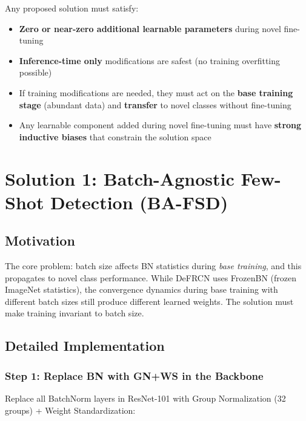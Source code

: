 \documentclass[11pt,a4paper]{article}
\begin{document}
Any proposed solution must satisfy:
\begin{itemize}[nosep]
    \item \textbf{Zero or near-zero additional learnable parameters} during novel fine-tuning
    \item \textbf{Inference-time only} modifications are safest (no training overfitting possible)
    \item If training modifications are needed, they must act on the \textbf{base training stage} (abundant data) and \textbf{transfer} to novel classes without fine-tuning
    \item Any learnable component added during novel fine-tuning must have \textbf{strong inductive biases} that constrain the solution space
\end{itemize}


\section{Solution 1: Batch-Agnostic Few-Shot Detection (BA-FSD)}
\label{sec:bafsd}

\subsection{Motivation}

The core problem: batch size affects BN statistics during \textit{base training}, and this propagates to novel class performance. While DeFRCN uses FrozenBN (frozen ImageNet statistics), the convergence dynamics during base training with different batch sizes still produce different learned weights. The solution must make training invariant to batch size.

\subsection{Detailed Implementation}

\subsubsection{Step 1: Replace BN with GN+WS in the Backbone}

Replace all BatchNorm layers in ResNet-101 with Group Normalization (32 groups) + Weight Standardization:
\end{document}

